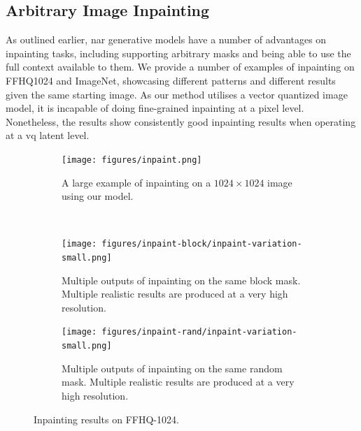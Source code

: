 \subsection{Arbitrary Image Inpainting}

As outlined earlier, \acrlong{nar} generative models have a number of advantages
on inpainting tasks, including supporting arbitrary masks and being able to use
the full context available to them. We provide a number of examples of
inpainting on FFHQ1024 and ImageNet, showcasing different patterns and different
results given the same starting image. As our method utilises a vector quantized
image model, it is incapable of doing fine-grained inpainting at a pixel level.
Nonetheless, the results show consistently good inpainting results when
operating at a \gls{vq} latent level.

\begin{figure}[ht]
    \centering
    \begin{subfigure}[b]{\textwidth}
        \centering
        \label{fig:inpaintExample}
        \texttt{[image: figures/inpaint.png]}
        \caption{A large example of inpainting on a $1024 \times 1024$ image using our
        model.}
    \end{subfigure}
    \\
    \begin{subfigure}[b]{0.47\textwidth}
        \centering
        \texttt{[image: figures/inpaint-block/inpaint-variation-small.png]}
        \caption{
            Multiple outputs of inpainting on the same block mask. Multiple
            realistic results are produced at a very high resolution.
        }
    \end{subfigure}
    \hfill
    \begin{subfigure}[b]{0.47\textwidth}
        \centering
        \texttt{[image: figures/inpaint-rand/inpaint-variation-small.png]}
        \caption{
            Multiple outputs of inpainting on the same random mask. Multiple
            realistic results are produced at a very high resolution.
        }
    \end{subfigure}
    \caption{Inpainting results on FFHQ-1024.}
\end{figure}

